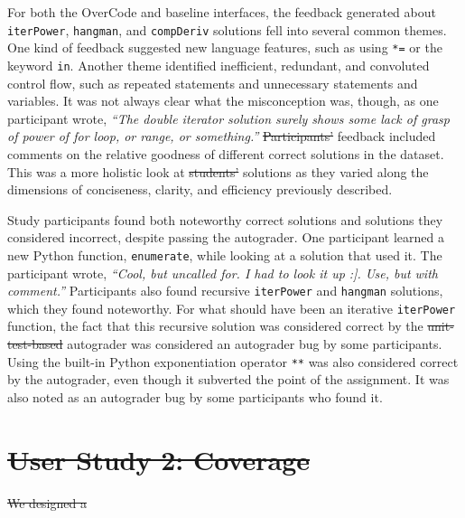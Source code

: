 \documentclass[12pt,twoside]{mitthesis}
\newcommand \codevar[1]{\texttt{#1}}
\providecommand{\DIFaddtex}[1]{{\protect\color{blue}\uwave{#1}}} %
\providecommand{\DIFdeltex}[1]{{\protect\color{red}\sout{#1}}}                      %
\providecommand{\DIFaddbegin}{} %
\providecommand{\DIFaddend}{} %
\providecommand{\DIFdelbegin}{} %
\providecommand{\DIFdelend}{} %
\providecommand{\DIFadd}[1]{\texorpdfstring{\DIFaddtex{#1}}{#1}} %
\providecommand{\DIFdel}[1]{\texorpdfstring{\DIFdeltex{#1}}{}} %
\begin{document}
{{{{{{{{{{For both the OverCode and baseline interfaces, the feedback generated about \codevar{iterPower}, \codevar{hangman}, and \codevar{compDeriv} solutions fell into several common themes. One kind of feedback suggested new language features, such as using \codevar{*=} or the keyword \codevar{in}. Another theme identified inefficient, redundant, and convoluted control flow, such as repeated statements and unnecessary statements and variables. It was not always clear what the misconception was, though, as one participant wrote, \textit{``The double iterator solution surely shows some lack of grasp of power of for loop, or range, or something.''} \DIFdelbegin \DIFdel{Participants' }\DIFdelend \DIFaddbegin \DIFadd{Participant }\DIFaddend feedback included comments on the relative goodness of different correct solutions in the dataset. This was a more holistic look at \DIFdelbegin \DIFdel{students' }\DIFdelend \DIFaddbegin \DIFadd{student }\DIFaddend solutions as they varied along the dimensions of conciseness, clarity, and efficiency previously described.

Study participants found both noteworthy correct solutions and solutions they considered incorrect, despite passing the autograder. One participant learned a new Python function, \codevar{enumerate}, while looking at a solution that used it. The participant wrote, \textit{``Cool, but uncalled for. I had to look it up :]. Use, but with comment.''} Participants also found recursive \codevar{iterPower} and \codevar{hangman} solutions, which they found noteworthy. For what should have been an iterative \codevar{iterPower} function, the fact that this recursive solution was considered correct by the \DIFdelbegin \DIFdel{unit-test-based }\DIFdelend autograder was considered an autograder bug by some participants. Using the built-in Python exponentiation operator \codevar{**} was also considered correct by the autograder, even though it subverted the point of the assignment. It was also noted as an autograder bug by some participants who found it.
\DIFdelbegin \section{\DIFdel{User Study 2: Coverage}}
\addtocounter{section}{-1}%
\DIFdelend 

\DIFdelbegin \DIFdel{We designed a }\DIFdelend \DIFaddbegin \subsection{\DIFadd{User Study 2: Coverage}}

}}}}}}}}}}
\end{document}
